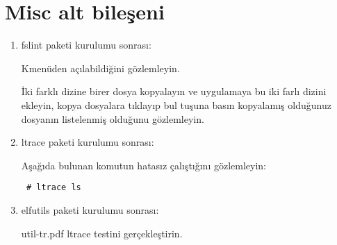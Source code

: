 \documentclass[a4paper,10pt]{article}
\begin{document}
\section{Misc alt bileşeni}
\begin{enumerate}
 \item fslint paketi kurulumu sonrası:

Kmenüden açılabildiğini gözlemleyin.

İki farklı dizine birer dosya kopyalayın ve uygulamaya bu iki farlı dizini ekleyin, kopya dosyalara tıklayıp bul tuşuna basın kopyalamış olduğunuz dosyanın listelenmiş olduğunu gözlemleyin.
 \item ltrace paketi kurulumu sonrası:

Aşağıda bulunan komutun hatasız çalıştığını gözlemleyin:
\begin{verbatim}
 # ltrace ls
\end{verbatim}
\item elfutils paketi kurulumu sonrası:

util-tr.pdf ltrace testini gerçekleştirin.
\end{enumerate}
\end{document}
